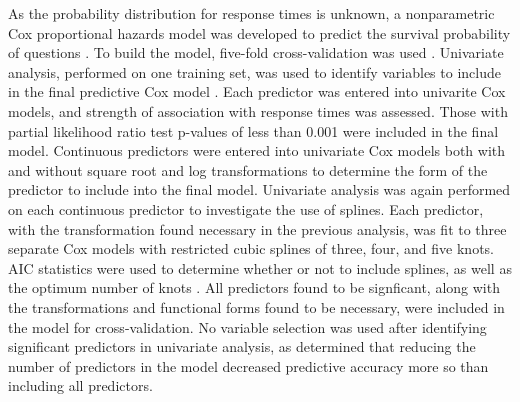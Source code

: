 \documentclass{article}
\begin{document}
As the probability distribution for response times is unknown, a nonparametric Cox proportional hazards model was developed to predict the survival probability of questions \cite{Moore2010}. To build the model, five-fold cross-validation was used \cite{Rodriguez2010}. Univariate analysis, performed on one training set, was used to identify variables to include in the final predictive Cox model \cite{Hammermeister1979}. Each predictor was entered into univarite Cox models, and strength of association with response times was assessed. Those with partial likelihood ratio test p-values of less than 0.001 were included in the final model. Continuous predictors were entered into univariate Cox models both with and without square root and log transformations to determine the form of the predictor to include into the final model. Univariate analysis was again performed on each continuous predictor to investigate the use of splines. Each predictor, with the transformation found necessary in the previous analysis, was fit to three separate Cox models with restricted cubic splines of three, four, and five knots. AIC statistics were used to determine whether or not to include splines, as well as the optimum number of knots \cite{Harrell2015}. All predictors found to be signficant, along with the transformations and functional forms found to be necessary, were included in the model for cross-validation. No variable selection was used after identifying significant predictors in univariate analysis, as \cite{Harrell2015} determined that reducing the number of predictors in the model decreased predictive accuracy more so than including all predictors. 
\end{document}
